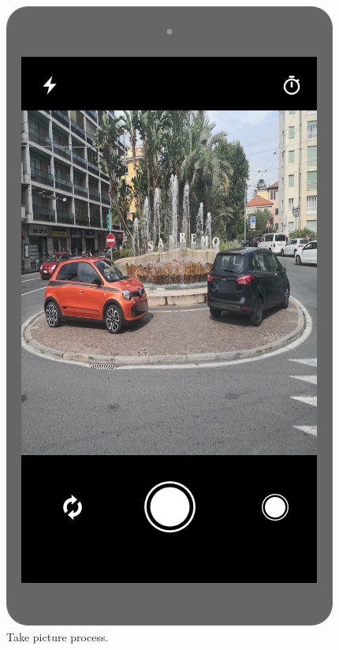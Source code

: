 \documentclass[./main.tex]{subfiles}
\begin{document}
\begin{figure}
    \centering
    \begin{minipage}[t]{\mockupdimension}
        \footnotesize
        \includegraphics[width=\textwidth]{resources/Mockups/picture}
        \caption{Take picture process.}
        \label{fig:picture}
    \end{minipage}

\end{figure}
\end{document}
